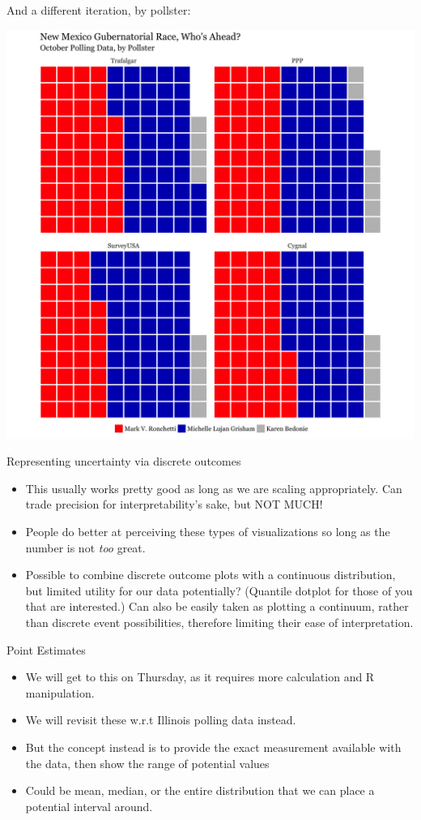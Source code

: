 \documentclass[
  ignorenonframetext,
]{beamer}
\begin{document}
\begin{frame}{And a different iteration, by pollster:}
\protect\hypertarget{and-a-different-iteration-by-pollster}{}
\centering

\includegraphics[width=0.65\linewidth,height=0.8\textheight]{all_nm_polls}
\end{frame}

\begin{frame}{Representing uncertainty via discrete outcomes}
\protect\hypertarget{representing-uncertainty-via-discrete-outcomes}{}
\begin{itemize}
\item
  This usually works pretty good as long as we are scaling
  appropriately. Can trade precision for interpretability's sake, but
  NOT MUCH!
\item
  People do better at perceiving these types of visualizations so long
  as the number is not \emph{too} great.
\item
  Possible to combine discrete outcome plots with a continuous
  distribution, but limited utility for our data potentially? (Quantile
  dotplot for those of you that are interested.) Can also be easily
  taken as plotting a continuum, rather than discrete event
  possibilities, therefore limiting their ease of interpretation.
\end{itemize}
\end{frame}

\begin{frame}{Point Estimates}
\protect\hypertarget{point-estimates}{}
\begin{itemize}
\item
  We will get to this on Thursday, as it requires more calculation and R
  manipulation.
\item
  We will revisit these w.r.t Illinois polling data instead.
\item
  But the concept instead is to provide the exact measurement available
  with the data, then show the range of potential values
\item
  Could be mean, median, or the entire distribution that we can place a
  potential interval around.
\end{itemize}
\end{frame}
\end{document}
